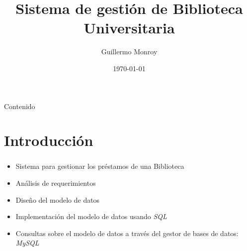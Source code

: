 \documentclass{beamer}
\title{Sistema de gestión de Biblioteca Universitaria}
\author{Guillermo Monroy}
\date{\today}
\begin{document}
\begin{frame}
\titlepage
\end{frame}

\begin{frame}{Contenido}
\tableofcontents
\end{frame}

\section{Introducción}
\begin{frame}
    \frametitle{\secname}
    \begin{itemize}
        \item Sistema para gestionar los préstamos de una Biblioteca
        \item Análisis de requerimientos
        \item Diseño del modelo de datos
        \item Implementación del modelo de datos usando \textit{SQL}
        \item Consultas sobre el modelo de datos a través del gestor de bases de datos: \textit{MySQL}
    \end{itemize}
\end{frame}
\end{document}
